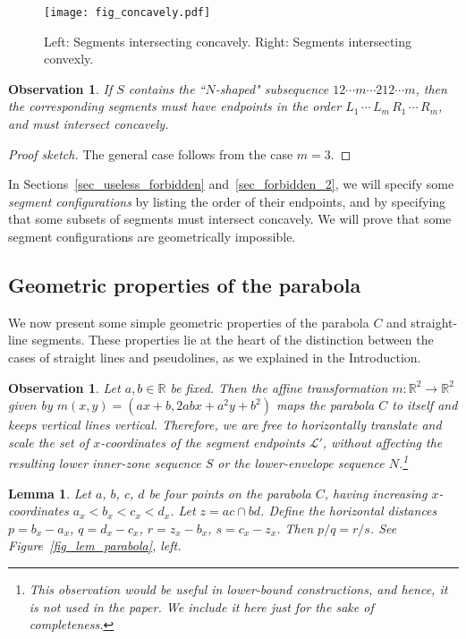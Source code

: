 \documentclass[11pt]{article}
\newcommand{\R}{{\mathbb R}}
\newtheorem{lemma}[theorem]{Lemma}
\newtheorem{observation}[theorem]{Observation}
\theoremstyle{definition}
\theoremstyle{remark}
\begin{document}
\begin{figure}
\centerline{\texttt{[image: fig\_concavely.pdf]}}
\caption{\label{fig_concavely}Left: Segments intersecting concavely. Right: Segments intersecting convexly.}
\end{figure}

\begin{observation}\label{obs_Nshaped}
If $S$ contains the ``$N$-shaped" subsequence $12\cdots m\cdots 212\cdots m$, then the corresponding segments must have endpoints in the order $L_1\,\cdots\, L_m\,\allowbreak R_1\,\cdots\, R_m$, and must intersect concavely.
\end{observation}

\begin{proof}[Proof sketch]
The general case follows from the case $m=3$.
\end{proof}

In Sections~\ref{sec_useless_forbidden} and~\ref{sec_forbidden_2}, we will specify some \emph{segment configurations} by listing the order of their endpoints, and by specifying that some subsets of segments must intersect concavely. We will prove that some segment configurations are geometrically impossible.

\subsection{Geometric properties of the parabola}

We now present some simple geometric properties of the parabola $C$ and straight-line segments. These properties lie at the heart of the distinction between the cases of straight lines and pseudolines, as we explained in the Introduction.

\begin{observation}
Let $a, b\in \R$ be fixed. Then the affine transformation $m:\R^2\to\R^2$ given by $m(x, y) = (ax+b,2abx+a^2y+b^2)$ maps the parabola $C$ to itself and keeps vertical lines vertical. Therefore, we are free to horizontally translate and scale the set of $x$-coordinates of the segment endpoints $\mathcal L'$, without affecting the resulting lower inner-zone sequence $S$ or the lower-envelope sequence $N$.\footnote{This observation would be useful in \emph{lower-bound constructions}, and hence, it is not used in the paper. We include it here just for the sake of completeness.}
\end{observation}

\begin{lemma}\label{lem_parabola}
Let $a$, $b$, $c$, $d$ be four points on the parabola $C$, having increasing $x$-coordinates $a_x < b_x < c_x < d_x$. Let $z = ac \cap bd$. Define the horizontal distances $p = b_x - a_x$, $q = d_x - c_x$, $r = z_x - b_x$, $s = c_x - z_x$. Then $p/q=r/s$. See Figure~\ref{fig_lem_parabola}, left.
\end{lemma}
\end{document}
